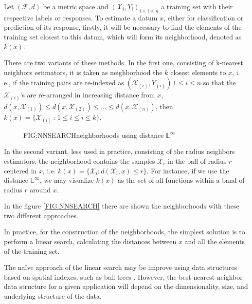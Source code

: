 
Let $(\mathcal{F}, d)$ be a metric space and
$(\mathcal{X}_i, {Y}_i)_{i \le i \le n}$ a training set with their
respective labels or responses.
To estimate a datum $x$, either for classification or prediction of its
response, firstly, it will be necessary to find the elements of the training set
closest to this datum, which will form its neighborhood, denoted as $k(x)$.

There are two variants of these methods. In the first one, consisting of
k-nearest neighbors estimators, it is taken as neighborhood the $k$ closest
elements to $x$, i. e., if the training pairs are re-indexed as
$(\mathcal{X}_{(i)}, Y_{(i)}) \, 1\le i\le n$ so that the
$\mathcal{X}_{(i)}$'s are re-arranged in increasing distance from $x$,
$d(x, \mathcal{X}_{(1)}) \le d(x, \mathcal{X}_{(2)}) \le \dots \le d(x, \mathcal{X}_{(n)})$,
 then $k(x) = \{\mathcal{X}_{(i)} \, : \, 1 \le i \le i\le k\}$.

\begin{figure}[neighborhoods using distance $\mathbb{L}^\infty$]{FIG:NNSEARCH}{neighborhoods using distance $\mathbb{L}^\infty$}
	 \quad
\end{figure}

In the second variant, less used in practice, consisting of the radius neighbors
estimators, the neighborhood contains the samples $\mathcal{X}_i$ in the ball of
radius $r$ centered in $x$, i.e.
$k(x) = \{ \mathcal{X}_i : d(\mathcal{X}_i , x) \le r\}$. For instance, if we
use the distance $\mathbb{L}^\infty$, we may visualize $k(x)$ as the set of all
functions within a band  of radius $r$ around $x$.

In the figure \ref{FIG:NNSEARCH} there are shown the neighborhoods with these two different
approaches.

In practice, for the construction of the neighborhoods, the simplest solution is
 to perform a linear search, calculating the distances between $x$ and all the
 elements of the training set.

The naïve approach of the linear search may be improve using data structures
based on spatial indexes, such as ball trees \cite{Kumar2008}. However, the best
nearest-neighbor data structure for a given application will depend on the
dimensionality, size, and underlying structure of the data.

